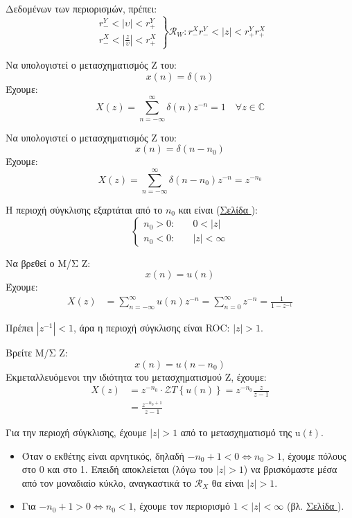 \documentclass[11pt,a4paper,notitlepage,fleqn,draft]{article}
\begin{document}
\begin{enumpar}
    Δεδομένων των περιορισμών, πρέπει:
    \[
    \left.
    \begin{matrix}
    r_-^Y < |υ| < r_+^Y\\
    r_-^X < \left|\frac{z}{υ}\right| < r_+^X
    \end{matrix}
    \right\rbrace
    \mathcal{R}_W: r_-^Xr_-^Y < |z| < r_+^Yr_+^X
    \]
\end{enumpar}

\begin{exercise}
	Να υπολογιστεί ο μετασχηματισμός Z του:
	\[
	x(n) = δ(n)
	\]
	\tcblower
	Έχουμε:
	\[
	X(z) = \sum_{n=-\infty}^{\infty} δ(n)z^{-n} = 1 \quad \forall z\in \mathbb C 
	\]
\end{exercise}

\begin{exercise}
	Να υπολογιστεί ο μετασχηματισμός Z του:
	\[
	x(n) = δ(n-n_0)
	\]
	\tcblower
	Έχουμε:
	\[
	X(z) = \sum_{n=-\infty}^{\infty} δ(n-n_0)z^{-n} = z^{-n_0}
	\]
	
	Η περιοχή σύγκλισης εξαρτάται από το \( n_0 \) και είναι (\hyperref[sec:znroc]{Σελίδα \pageref{sec:znroc}}):
	\[
	\begin{cases}
	n_0 > 0: &\quad 0 < |z|\\
	n_0 < 0: &\quad |z| < \infty
	\end{cases}
	\]
\end{exercise}

\begin{exercise}
	Να βρεθεί ο Μ/Σ Z:
	\[
	x(n) = u(n)
	\]
	\tcblower
	Έχουμε:
	\begin{align*}
		X(z) &= \sum_{n=-\infty}^\infty u(n)z^{-n} = \sum_{n=0}^{\infty} z^{-n}
		= \frac{1}{1-z^{-1}}
	\end{align*}
	
	Πρέπει \( |z^{-1}| < 1 \), άρα η περιοχή σύγκλισης είναι ROC: \( |z|>1 \).
\end{exercise}

\begin{exercise}
	Βρείτε Μ/Σ Z:
	\[
	x(n) = u(n-n_0)
	\]
	\tcblower
	Εκμεταλλευόμενοι την ιδιότητα του μετασχηματισμού Z, έχουμε:
	\begin{align*}
		X(z) &=z^{-n_0} \cdot \mathcal{Z}T\left\lbrace u(n) \right\rbrace
		= z^{-n_0}\frac{z}{z-1}
		\\ &= \frac{z^{-n_0+1}}{z-1}
	\end{align*}
	
	Για την περιοχή σύγκλισης, έχουμε \( |z|>1 \) από το μετασχηματισμό της
	\( \mathrm{u}(t) \).
	\begin{itemize}
		\item Όταν ο εκθέτης είναι αρνητικός, δηλαδή \( -n_0+1 < 0 \iff n_0 > 1 \), έχουμε
		πόλους στο 0 και στο 1. Επειδή αποκλείεται (λόγω του \( |z|>1 \)) να
		βρισκόμαστε μέσα από τον μοναδιαίο κύκλο, αναγκαστικά το \( \mathcal{R}_X \) θα
		είναι \( |z|>1 \).
		\item Για \( -n_0 + 1 > 0 \iff n_0 < 1 \), έχουμε τον περιορισμό \( 1<|z|<\infty \) (βλ. \hyperref[sec:znroc]{Σελίδα \pageref{sec:znroc}}).
	\end{itemize}
\end{exercise}
\end{document}
